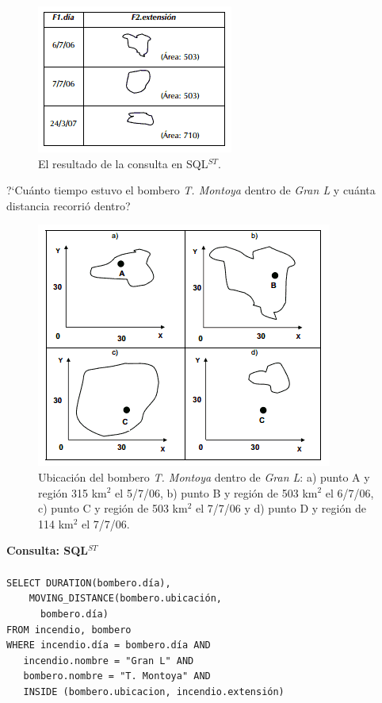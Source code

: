 \documentclass[a4paper,12pt,oneside]{report}
\begin{document}
\begin{figure}
\center
\includegraphics[scale=0.6]{images/consulta2sqlst.png}

\caption{El resultado de la consulta en SQL$^{ST}$.}
\end{figure}


\noindent ?`Cu\'anto tiempo estuvo el bombero \textit{T. Montoya} dentro de \textit{Gran L} y cu\'anta distancia recorri\'o dentro?\\
\begin{figure}
\center
\includegraphics[scale=0.6]{images/movbombero.png}
\caption{Ubicaci\'on del bombero \textit{T. Montoya} dentro de \textit{Gran L}: a) punto A y regi\'on 315 km$^{2}$ el 5/7/06, b) punto B y regi\'on de 503 km$^{2}$ el 6/7/06, c) punto C y regi\'on de 503 km$^{2}$ el 7/7/06 y d) punto D y regi\'on de 114 km$^{2}$ el 7/7/06.}
\end{figure}

\noindent \textbf{Consulta: SQL$^{ST}$}\\
\ \\
\texttt{SELECT DURATION(bombero.d\'ia),\\
\ \ \ \ MOVING\_DISTANCE(bombero.ubicaci\'on,\\
\ \ \ \ \ \ bombero.d\'ia)\\
FROM incendio, bombero\\
WHERE incendio.d\'ia = bombero.d\'ia AND\\
\ \ \ incendio.nombre = "Gran L" AND\\
\ \ \ bombero.nombre = "T. Montoya" AND\\
\ \ \ INSIDE (bombero.ubicacion, incendio.extensi\'on)}
\end{document}
